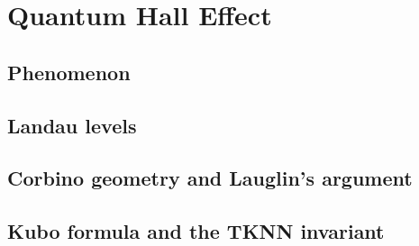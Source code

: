 %

\chapter{Quantum Hall Effect}
\section{Phenomenon}
\section{Landau levels}
\section{Corbino geometry and Lauglin's argument}
\section{Kubo formula and the TKNN invariant}